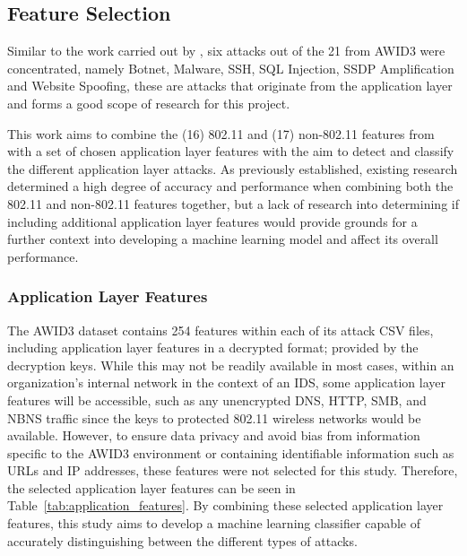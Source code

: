 

\subsection{Feature Selection}

Similar to the work carried out by \textcite{s22155633}, six attacks out of the 21 from AWID3 were concentrated, namely Botnet, Malware, SSH, SQL Injection, SSDP Amplification and Website Spoofing, these are attacks that originate from the application layer and forms a good scope of research for this project. 

This work aims to combine the (16) 802.11 and (17) non-802.11 features from \cite{s22155633} with a set of chosen application layer features with the aim to detect and classify the different application layer attacks. As previously established, existing research determined a high degree of accuracy and performance when combining both the 802.11 and non-802.11 features together, but a lack of research into determining if including additional application layer features would provide grounds for a further context into developing a machine learning model and affect its overall performance.

\subsubsection{Application Layer Features}

The AWID3 dataset contains 254 features within each of its attack CSV files, including application layer features in a decrypted format; provided by the decryption keys. While this may not be readily available in most cases, within an organization's internal network in the context of an IDS, some application layer features will be accessible, such as any unencrypted DNS, HTTP, SMB, and NBNS traffic since the keys to protected 802.11 wireless networks would be available. However, to ensure data privacy and avoid bias from information specific to the AWID3 environment or containing identifiable information such as URLs and IP addresses, these features were not selected for this study. Therefore, the selected application layer features can be seen in Table~\ref{tab:application_features}. By combining these selected application layer features, this study aims to develop a machine learning classifier capable of accurately distinguishing between the different types of attacks.


